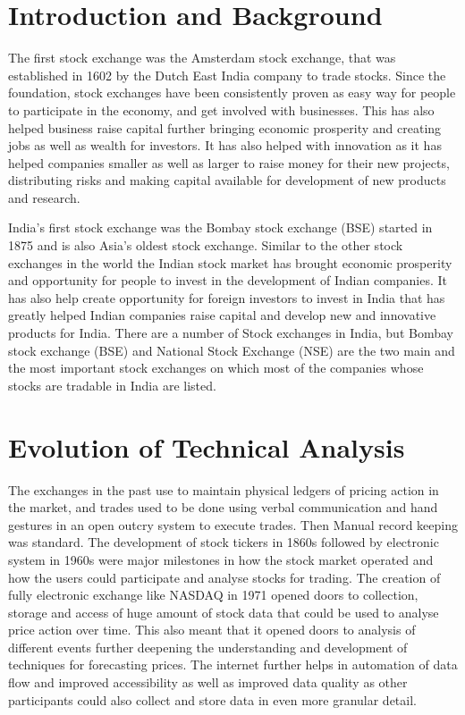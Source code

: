  \section{Introduction and Background}

The first stock exchange was the Amsterdam stock exchange, that was established in 1602 by the Dutch East India company to trade stocks. Since the foundation, stock exchanges have been consistently proven as easy way for people to participate in the economy, and get involved with businesses. This has also helped business raise capital further bringing economic prosperity and creating jobs as well as wealth for investors. It has also helped with innovation as it has helped companies smaller as well as larger to raise money for their new projects, distributing risks and making capital available for development of new products and research.

India's first stock exchange was the Bombay stock exchange (BSE) started in 1875 and is also Asia's oldest stock exchange. Similar to the other stock exchanges in the world the Indian stock market has brought economic prosperity and opportunity for people to invest in the development of Indian companies. It has also help create opportunity for foreign investors to invest in India that has greatly helped Indian companies raise capital and develop new and innovative products for India. There are a number of Stock exchanges in India, but Bombay stock exchange (BSE) and National Stock Exchange (NSE) are the two main and the most important stock exchanges on which most of the companies whose stocks are tradable in India are listed.

\section{Evolution of Technical Analysis}

The exchanges in the past use to maintain physical ledgers of pricing action in the market, and trades used to be done using verbal communication and hand gestures in an open outcry system to execute trades. Then Manual record keeping was standard.
The development of stock tickers in 1860s followed by electronic system in 1960s were major milestones in how the stock market operated and how the users could participate and analyse stocks for trading. The creation of fully electronic exchange like NASDAQ in 1971 opened doors to collection, storage and access of huge amount of stock data that could be used to analyse price action over time. This also meant that it opened doors to analysis of different events further deepening the understanding and development of techniques for forecasting prices.  The internet further helps in automation of data flow and improved accessibility as well as improved data quality as other participants could also collect and store data in even more granular detail.


